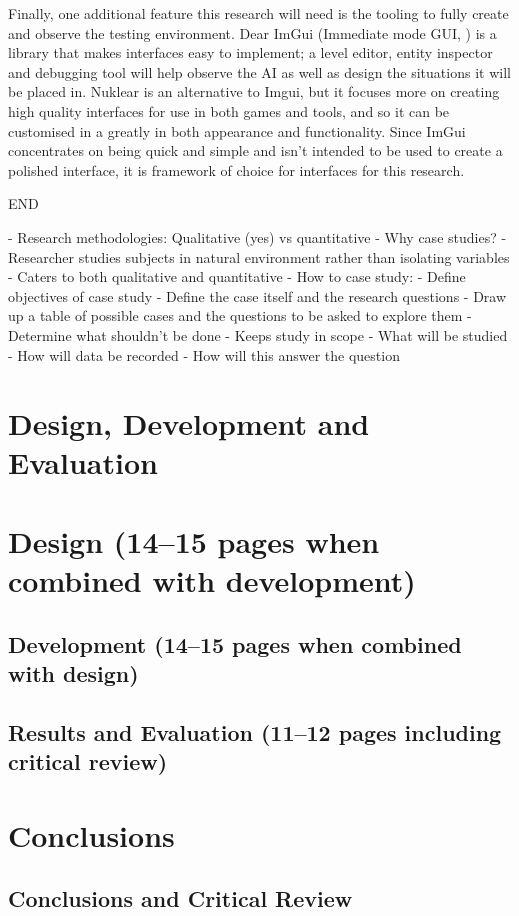 \documentclass[11pt, a4paper]{article}
\begin{document}
Finally, one additional feature this research will need is the tooling to fully create and observe the testing environment. Dear ImGui (Immediate mode GUI, \cite{Imgui}) is a library that makes interfaces easy to implement; a level editor, entity inspector and debugging tool will help observe the AI as well as design the situations it will be placed in. Nuklear \parencite{Nuklear} is an alternative to Imgui, but it focuses more on creating high quality interfaces for use in both games and tools, and so it can be customised in a greatly in both appearance and functionality. Since ImGui concentrates on being quick and simple and isn't intended to be used to create a polished interface, it is framework of choice for interfaces for this research.

END

- Research methodologies: Qualitative (yes) vs quantitative
  - Why case studies?
    - Researcher studies subjects in natural environment rather than isolating variables
    - Caters to both qualitative and quantitative
  - How to case study:
    - Define objectives of case study
    - Define the case itself and the research questions
      - Draw up a table of possible cases and the questions to be asked to explore them
    - Determine what shouldn't be done \parencite[546]{baxter2008qualitative}
      - Keeps study in scope
    - What will be studied
    - How will data be recorded
    - How will this answer the question

\section {Design, Development and Evaluation}

\section{Design (14--15 pages when combined with development)}

\subsection {Development (14--15 pages when combined with design)}

\subsection {Results and Evaluation (11--12 pages including critical review)}

\section {Conclusions}

\subsection {Conclusions and Critical Review}

\printbibliography
\end{document}
